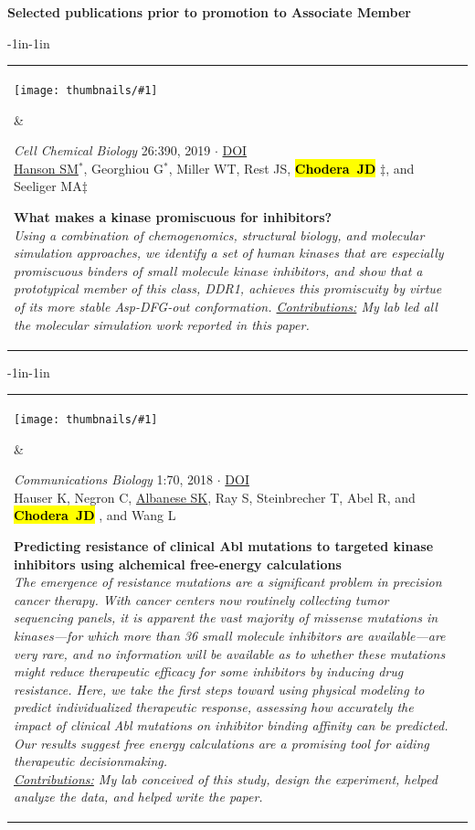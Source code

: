 \documentclass[10pt]{article}
\newcommand{\newarticle}[7]{
\begin{adjustwidth}{-1in}{-1in}  
\begin{tabular}{p{0.9in}p{7in}}
\parbox[c]{0.9in}{\texttt{[image: thumbnails/\#1]}} & \parbox[c]{6in}{\setstretch{0.9} {\small #4} $\cdot$ \href{#6}{#5} \\ {\footnotesize {#2}} \\ \raggedright { \bf\nohyphens{#3}}  \\ {\footnotesize\emph {#7}}} %
\end{tabular}
\end{adjustwidth}
\vspace{0.2in}
}
\newcommand{\jdc}{ {\bf \hl{Chodera~JD}} } %
\begin{document}
{\bf Selected publications prior to promotion to Associate Member} \\

\newarticle{ddr1-dfg-pmf.jpg}{\underline{Hanson SM}$^*$, Georghiou G$^*$, Miller WT, Rest JS, \jdc$\ddag$, and Seeliger MA$\ddag$}{What makes a kinase promiscuous for inhibitors?}{\emph{Cell Chemical Biology} 26:390, 2019}{DOI}{https://doi.org/10.1016/j.chembiol.2018.11.005}{Using a combination of chemogenomics, structural biology, and molecular simulation approaches, we identify a set of human kinases that are especially promiscuous binders of small molecule kinase inhibitors, and show that a prototypical member of this class, DDR1, achieves this promiscuity by virtue of its more stable Asp-DFG-out conformation.
\underline{Contributions:} My lab led all the molecular simulation work reported in this paper.
}

\newarticle{kinase-mutations}{Hauser K, Negron C, \underline{Albanese SK}, Ray S, Steinbrecher T, Abel R, and \jdc, and Wang L}{Predicting resistance of clinical Abl mutations to targeted kinase inhibitors using alchemical free-energy calculations}{\emph{Communications Biology} 1:70, 2018}{DOI}{https://doi.org/10.1038/s42003-018-0075-x}{The emergence of resistance mutations are a significant problem in precision cancer therapy. With cancer centers now routinely collecting tumor sequencing panels, it is apparent the vast majority of missense mutations in kinases---for which more than 36 small molecule inhibitors are available---are very rare, and no information will be available as to whether these mutations might reduce therapeutic efficacy for some inhibitors by inducing drug resistance. Here, we take the first steps toward using physical modeling to predict individualized therapeutic response, assessing how accurately the impact of clinical Abl mutations on inhibitor binding affinity can be predicted. Our results suggest free energy calculations are a promising tool for aiding therapeutic decisionmaking.\\
\underline{Contributions:} My lab conceived of this study, design the experiment, helped analyze the data, and helped write the paper.
}
\end{document}
